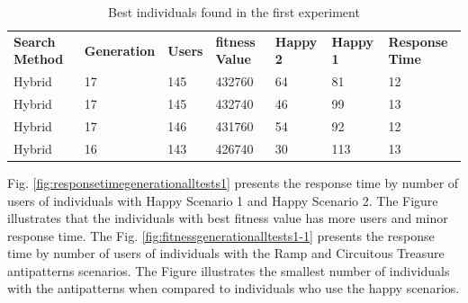 \documentclass[times]{stvrauth}
\begin{document}
\begin{table}[h]
\centering
\caption{Best individuals found in the first experiment}
\label{tab:bestindividuals}
\begin{tabular}{lllllll}
\rowcolor[HTML]{C0C0C0} 
\textbf{Search Method} & \textbf{Generation} & \textbf{Users} & \textbf{fitness Value} & \textbf{Happy 2} & \textbf{Happy 1} & \textbf{Response Time} \\
Hybrid & 17 & 145 & 432760 & 64 & 81 & 12 \\
Hybrid & 17 & 145 & 432740 & 46 & 99 & 13 \\
Hybrid & 17 & 146 & 431760 & 54 & 92 & 12 \\
Hybrid & 16 & 143 & 426740 & 30 & 113 & 13
\end{tabular}
\end{table}

Fig. \ref{fig:responsetimegenerationalltests1} presents the response time by number of users of individuals with Happy Scenario 1 and Happy Scenario 2. The Figure illustrates that the individuals with best fitness value has more users and minor response time. The Fig. \ref{fig:fitnessgenerationalltests1-1} presents the response time by number of users of individuals with the Ramp and Circuitous Treasure antipatterns scenarios. The Figure illustrates the smallest number of individuals with the antipatterns when compared to individuals who use the happy scenarios.
\end{document}
